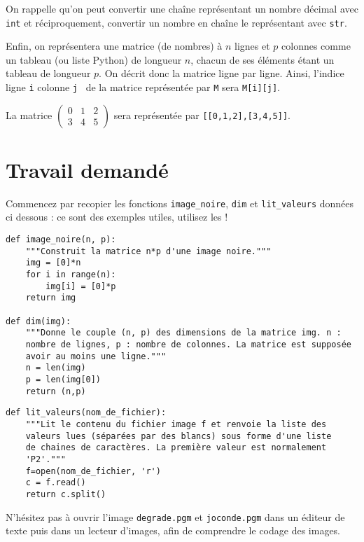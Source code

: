 \bigskip On rappelle qu'on peut convertir une chaîne représentant un nombre
décimal avec \texttt{int} et réciproquement, convertir un nombre en chaîne
le représentant avec \texttt{str}.

\bigskip Enfin, on représentera une matrice (de nombres) à $n$ lignes et $p$ colonnes comme un tableau (ou liste Python) de longueur $n$, chacun de ses éléments étant un tableau de longueur $p$. On décrit donc la matrice ligne par ligne. 
Ainsi, l'indice \og ligne \texttt{i} colonne \texttt{j} \fg\ de la matrice représentée par \texttt{M} sera \texttt{M[i][j]}.
\begin{exemple}
	La matrice $\begin{pmatrix} 0&1&2 \\ 3&4&5 \end{pmatrix}$ sera représentée par \texttt{[[0,1,2],[3,4,5]]}.
\end{exemple}


\section*{Travail demandé}

Commencez par recopier les fonctions  \texttt{image\_noire}, \texttt{dim} et  \texttt{lit\_valeurs} données ci dessous : ce sont des exemples utiles, utilisez les ! 

\begin{lstlisting}
def image_noire(n, p):
    """Construit la matrice n*p d'une image noire."""
    img = [0]*n
    for i in range(n):
        img[i] = [0]*p
    return img
	
def dim(img):
    """Donne le couple (n, p) des dimensions de la matrice img. n :
    nombre de lignes, p : nombre de colonnes. La matrice est supposée
    avoir au moins une ligne."""
    n = len(img)
    p = len(img[0])
    return (n,p)
\end{lstlisting}

\begin{lstlisting}
def lit_valeurs(nom_de_fichier):
    """Lit le contenu du fichier image f et renvoie la liste des
    valeurs lues (séparées par des blancs) sous forme d'une liste
    de chaines de caractères. La première valeur est normalement
    'P2'."""
    f=open(nom_de_fichier, 'r')
    c = f.read()
    return c.split()
\end{lstlisting}



N'hésitez pas à ouvrir l'image \texttt{degrade.pgm} et \texttt{joconde.pgm} dans un éditeur de texte puis dans un lecteur d'images, afin de comprendre le codage des images.


